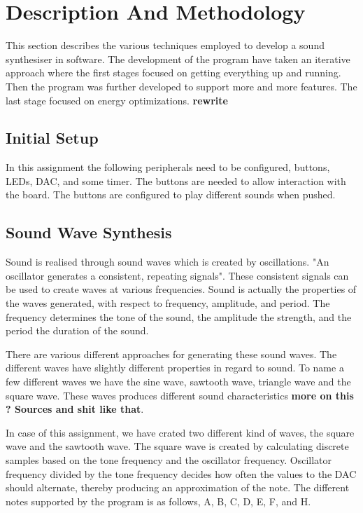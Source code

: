 \section{Description And Methodology}
This section describes the various techniques employed to develop a sound synthesiser in software. The development of the program have taken an iterative approach where the first stages focused on getting everything up and running. Then the program was further developed to support more and more features. The last stage focused on energy optimizations. {\bf rewrite}


\subsection{Initial Setup}
In this assignment the following peripherals need to be configured, buttons, LEDs, DAC, and some timer. The buttons are needed to allow interaction with the board. The buttons are configured to play different sounds when pushed. 




\subsection{Sound Wave Synthesis}
Sound is realised through sound waves which is created by oscillations. "An oscillator generates a consistent, repeating signals". These consistent signals can be used to create waves at various frequencies. Sound is actually the properties of the waves generated, with respect to frequency, amplitude, and period. The frequency determines the tone of the sound, the amplitude the strength, and the period the duration of the sound.  

There are various different approaches for generating these sound waves. The different waves have slightly different properties in regard to sound. To name a few different waves we have the sine wave, sawtooth wave, triangle wave and the square wave. These waves produces different sound characteristics {\bf more on this ? Sources and shit like that}. 

In case of this assignment, we have crated two different kind of waves, the square wave and the sawtooth wave. The square wave is created by calculating discrete samples based on the tone frequency and the oscillator frequency. Oscillator frequency divided by the tone frequency decides how often the values to the DAC should alternate, thereby producing an approximation of the note. The different notes supported by the program is as follows, A, B, C, D, E, F, and H.


